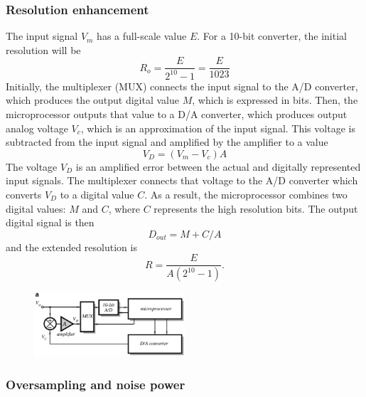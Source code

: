 \subsubsection{Resolution enhancement}

The input signal $V_m$ has a full-scale value $E$. For a 10-bit converter, the
initial resolution will be $$ R_o = \frac{E}{2^{10} - 1} = \frac{E}{1023} $$
Initially, the multiplexer (MUX) connects the input signal
to the A/D converter, which produces the output digital value $M$, which is
expressed in bits. Then, the microprocessor outputs that value to a D/A converter,
which produces output analog voltage $V_c$, which is an approximation of the input
signal. This voltage is subtracted from the input signal and amplified by the
amplifier to a value $$ V_D = (V_m - V_c) A $$
The voltage $V_D$ is an amplified error between the actual and digitally represented
input signals. The multiplexer connects that voltage to the A/D converter which converts $V_D$ to a
digital value $C$.
As a result, the microprocessor combines two digital values: $M$ and $C$, where
$C$ represents the high resolution bits. The output digital signal is then
\[
    D_{out} = M + C/A
\]
and the extended resolution is
\[
    R = \frac{E}{A\left( 2^{10} - 1 \right)}.
\]

\begin{figure}[H]
    \centering
    \includegraphics[width =  0.5\textwidth]{L5/img/resolution-extension.PNG}
\end{figure}


\subsubsection{Oversampling and noise power}

